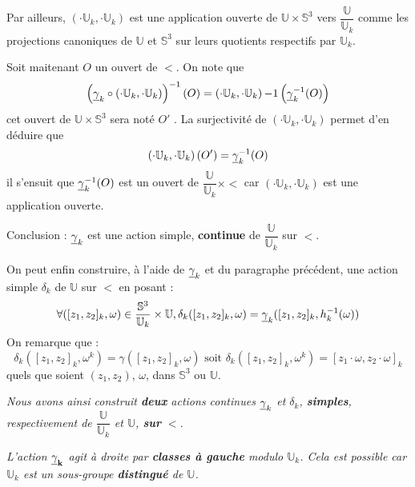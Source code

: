Par ailleurs, $\left(\cdot\mathbb{U}_k,\cdot\mathbb{U}_k\right)$ est une application ouverte de $\mathbb{U}\times\mathbb{S}^3$ vers $\dfrac{\mathbb{U}}{\mathbb{U}_k}$ %
comme les projections canoniques de $\mathbb{U}$ et $\mathbb{S}^3$ sur leurs quotients respectifs par $\mathbb{U}_k$.
\par
Soit maitenant $O$ un ouvert de $\lt$. On note que
\[\left(\gk\circ\left(\cdot\mathbb{U}_k,\cdot\mathbb{U}_k\right)\right)^{-1}(O)=%
\left(\cdot\mathbb{U}_k,\cdot\mathbb{U}_k\right){-1}\left(\gk^{-1}(O)\right)\]
cet ouvert de $\mathbb{U}\times\mathbb{S}^3$ sera not\'e $O'$ .%
La surjectivit\'e de $\left(\cdot\mathbb{U}_k,\cdot\mathbb{U}_k\right)$ permet d'en d\'eduire que
\[\left(\cdot\mathbb{U}_k,\cdot\mathbb{U}_k\right)(O')=\underline{\gamma}_{k}^{-1}(O)\]
il s'ensuit que $\underline{\gamma}_{k}^{-1}(O)$ est un ouvert de $\dfrac{\mathbb{U}}{\mathbb{U}_k}\times\lt$ car $\left(\cdot\mathbb{U}_k,\cdot\mathbb{U}_k\right)$ est une application ouverte.
\par
Conclusion : $\underline{\gamma}_{k}$ est une action simple, \textbf{continue} de $\dfrac{\mathbb{U}}{\mathbb{U}_k}$ sur $\lt$.
\par
On peut enfin construire, \`a l'aide de $\underline{\gamma}_{k}$ et du paragraphe pr\'ec\'edent, une action simple $\delta_k$ de $\mathbb{U}$ sur $\lt$ en posant :
\[\forall ([z_1,z_2]_k,\omega)\in\dfrac{\mathbb{S}^3}{\mathbb{U}_{k}}\times\mathbb{U},\delta_k([z_1,z_2]_k,\omega)=\underline{\gamma}_{k}([z_1,z_2]_k,h_k^{-1}(\omega))\]
On remarque que :
\[\delta_k\left([z_1,z_2]_k,\omega^k\right)=\gamma([z_1,z_2]_k,\omega)\text{ soit }\delta_k\left([z_1,z_2]_k,\omega^k\right)=[z_1\cdot\omega,z_2\cdot\omega]_k\]
quels que soient $(z_1,z_2)$, $\omega$, dans $\mathbb{S}^3$ ou $\mathbb{U}$.
\par
\emph{Nous avons ainsi construit \textbf{deux} actions continues $\underline{\gamma}_{k}$ et $\delta_k$, \textbf{simples}, respectivement de $\dfrac{\mathbb{U}}{\mathbb{U}_k}$ et $\mathbb{U}$, %
\textbf{sur} $\mathbf{\lt}$.}
\par
\emph{L'action $\mathbf{\underline{\gamma}_{k}}$ agit \`a droite par \textbf{classes \`a gauche} modulo $\mathbb{U}_k$. %
Cela est possible car $\mathbb{U}_k$ est un sous-groupe \textbf{distingu\'e} de $\mathbb{U}$.}

